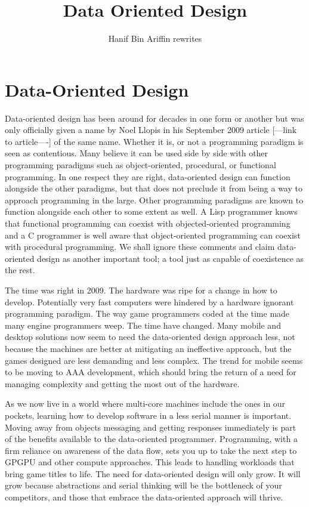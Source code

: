 \documentclass[a4paper,12pt]{article}
\author{Hanif Bin Ariffin rewrites}
\title{Data Oriented Design}
\begin{document}
\maketitle
\tableofcontents

\newpage
\section{Data-Oriented Design}

Data-oriented design has been around for decades in one form or another but was only officially given a name by Noel Llopis in his September 2009 article [---link to article----] of the same name.
Whether it is, or not a programming paradigm is seen as contentious.
Many believe it can be used side by side with other programming paradigms such as object-oriented, procedural, or functional programming.
In one respect they are right, data-oriented design can function alongside the other paradigms, but that does not preclude it from being a way to approach programming in the large.
Other programming paradigms are known to function alongside each other to some extent as well.
A Lisp programmer knows that functional programming can coexist with objected-oriented programming and a C programmer is well aware that object-oriented programming can coexist with procedural programming.
We shall ignore these comments and claim data-oriented design as another important tool;
a tool just as capable of coexistence as the rest.

The time was right in 2009.
The hardware was ripe for a change in how to develop.
Potentially very fast computers were hindered by a hardware ignorant programming paradigm.
The way game programmers coded at the time made many engine programmers weep.
The time have changed.
Many mobile and desktop solutions now seem to need the data-oriented design approach less, not because the machines are better at mitigating an ineffective approach, but the games designed are less demanding and less complex.
The trend for mobile seems to be moving to AAA development, which should bring the return of a need for managing complexity and getting the most out of the hardware.

As we now live in a world where multi-core machines include the ones in our pockets, learning how to develop software in a less serial manner is important.
Moving away from objects messaging and getting responses immediately is part of the benefits available to the data-oriented programmer.
Programming, with a firm reliance on awareness of the data flow, sets you up to take the next step to GPGPU and other compute approaches.
This leads to handling workloads that bring game titles to life.
The need for data-oriented design will only grow.
It will grow because abstractions and serial thinking will be the bottleneck of your competitors, and those that embrace the data-oriented approach will thrive.
\end{document}
